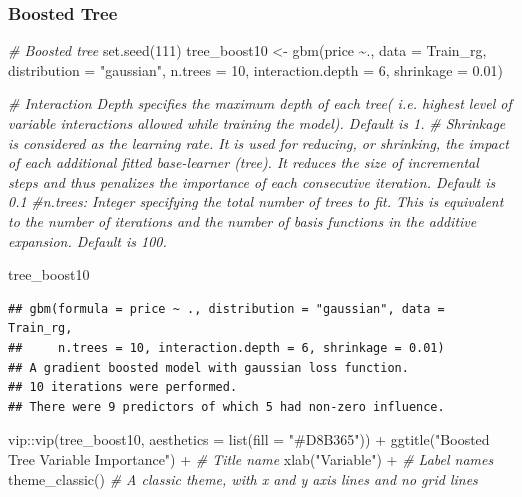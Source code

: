 \documentclass[
]{article}
\newenvironment{Shaded}{\begin{snugshade}}{\end{snugshade}}
\newcommand{\AttributeTok}[1]{\textcolor[rgb]{0.77,0.63,0.00}{#1}}
\newcommand{\CommentTok}[1]{\textcolor[rgb]{0.56,0.35,0.01}{\textit{#1}}}
\newcommand{\DecValTok}[1]{\textcolor[rgb]{0.00,0.00,0.81}{#1}}
\newcommand{\FloatTok}[1]{\textcolor[rgb]{0.00,0.00,0.81}{#1}}
\newcommand{\FunctionTok}[1]{\textcolor[rgb]{0.00,0.00,0.00}{#1}}
\newcommand{\NormalTok}[1]{#1}
\newcommand{\OtherTok}[1]{\textcolor[rgb]{0.56,0.35,0.01}{#1}}
\newcommand{\SpecialCharTok}[1]{\textcolor[rgb]{0.00,0.00,0.00}{#1}}
\newcommand{\StringTok}[1]{\textcolor[rgb]{0.31,0.60,0.02}{#1}}
\begin{document}
\hypertarget{boosted-tree}{%
\subsubsection{Boosted Tree}\label{boosted-tree}}

\begin{Shaded}
\begin{Highlighting}[]
\CommentTok{\# Boosted tree}
\FunctionTok{set.seed}\NormalTok{(}\DecValTok{111}\NormalTok{)}
\NormalTok{tree\_boost10 }\OtherTok{\textless{}{-}} \FunctionTok{gbm}\NormalTok{(price }\SpecialCharTok{\textasciitilde{}}\NormalTok{., }\AttributeTok{data =}\NormalTok{ Train\_rg, }\AttributeTok{distribution =} \StringTok{"gaussian"}\NormalTok{, }\AttributeTok{n.trees =} \DecValTok{10}\NormalTok{, }\AttributeTok{interaction.depth =} \DecValTok{6}\NormalTok{, }\AttributeTok{shrinkage =} \FloatTok{0.01}\NormalTok{)}

\CommentTok{\# Interaction Depth specifies the maximum depth of each tree( i.e. highest level of variable interactions allowed while training the model). Default is 1.}
\CommentTok{\# Shrinkage is considered as the learning rate. It is used for reducing, or shrinking, the impact of each additional fitted base{-}learner (tree).  It reduces the size of incremental steps and thus penalizes the importance of each consecutive iteration. Default is 0.1}
\CommentTok{\#n.trees: Integer specifying the total number of trees to fit. This is equivalent to the number of iterations and the number of basis functions in the additive expansion. Default is 100.}


\NormalTok{tree\_boost10}
\end{Highlighting}
\end{Shaded}

\begin{verbatim}
## gbm(formula = price ~ ., distribution = "gaussian", data = Train_rg, 
##     n.trees = 10, interaction.depth = 6, shrinkage = 0.01)
## A gradient boosted model with gaussian loss function.
## 10 iterations were performed.
## There were 9 predictors of which 5 had non-zero influence.
\end{verbatim}

\begin{Shaded}
\begin{Highlighting}[]
\NormalTok{vip}\SpecialCharTok{::}\FunctionTok{vip}\NormalTok{(tree\_boost10, }\AttributeTok{aesthetics =} \FunctionTok{list}\NormalTok{(}\AttributeTok{fill =} \StringTok{"\#D8B365"}\NormalTok{)) }\SpecialCharTok{+}
  \FunctionTok{ggtitle}\NormalTok{(}\StringTok{"Boosted Tree Variable Importance"}\NormalTok{) }\SpecialCharTok{+} \CommentTok{\# Title name}
  \FunctionTok{xlab}\NormalTok{(}\StringTok{"Variable"}\NormalTok{) }\SpecialCharTok{+} \CommentTok{\# Label names}
  \FunctionTok{theme\_classic}\NormalTok{() }\CommentTok{\# A classic theme, with x and y axis lines and no grid lines}
\end{Highlighting}
\end{Shaded}
\end{document}
